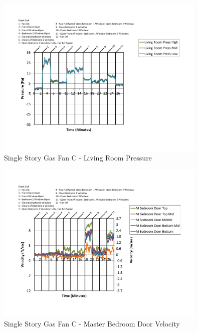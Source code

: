 \documentclass{article}
\begin{document}
\begin{appendices}
	\begin{figure}[H]
		\centering
		\includegraphics[height=3.05in,trim=0.67in 1.1in 0.67in 0.8in,clip=true]{0_Images/Results_Charts/ColdFlow/Single_Story/Gas/C/Living_Room_Pressure.pdf}
		\caption{Single Story Gas Fan C - Living Room Pressure}
	\end{figure}
 

	\begin{figure}[H]
		\centering
		\includegraphics[height=3.05in,trim=0.67in 1.1in 0.67in 0.8in,clip=true]{0_Images/Results_Charts/ColdFlow/Single_Story/Gas/C/Master_Bedroom_Door_Velocity.pdf}
		\caption{Single Story Gas Fan C - Master Bedroom Door Velocity}
	\end{figure}
 
	\clearpage


\end{appendices}
\end{document}
